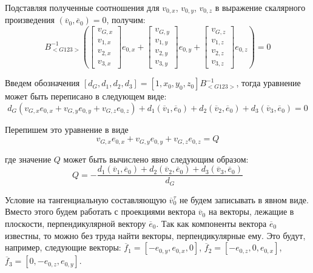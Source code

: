 Подставляя полученные соотношения для $v_{0,x}$, $v_{0,y}$, $v_{0,z}$ в выражение скалярного произведения $(\overline{v}_0, \overline{e}_0) = 0$, получим:
\begin{equation}
	[1, x_0, y_0, z_0] B_{<G123>}^{-1}
	\left(
		\begin{bmatrix}
			v_{G,x} \\
			v_{1,x} \\
			v_{2,x} \\
			v_{3,x}
		\end{bmatrix} e_{0,x} +
		\begin{bmatrix}
			v_{G,y} \\
			v_{1,y} \\
			v_{2,y} \\
			v_{3,y}
		\end{bmatrix} e_{0,y} +
		\begin{bmatrix}
			v_{G,z} \\
			v_{1,z} \\
			v_{2,z} \\
			v_{3,z}
		\end{bmatrix} e_{0,z}
	\right) = 0
\end{equation}

Введем обозначения $[d_G, d_1, d_2, d_3] = [1, x_0, y_0, z_0] B_{<G123>}^{-1}$, тогда уравнение может быть переписано в следующем виде:
\begin{equation}
	d_G(v_{G,x}e_{0,x} + v_{G,y}e_{0,y} + v_{G,z}e_{0,z}) + d_1(\overline{v}_1, \overline{e}_0) + d_2(\overline{v}_2, \overline{e}_0) + d_3(\overline{v}_3, \overline{e}_0) = 0
\end{equation}

Перепишем это уравнение в виде
\begin{equation}
	v_{G,x}e_{0,x} + v_{G,y}e_{0,y} + v_{G,z}e_{0,z} = Q
\end{equation}

где значение $Q$ может быть вычислено явно следующим образом:
\begin{equation}
	Q = -\frac{d_1(\overline{v}_1, \overline{e}_0) + d_2(\overline{v}_2, \overline{e}_0) + d_3(\overline{v}_3, \overline{e}_0)}{d_G}
\end{equation}

Условие на тангенциальную составляющую $\overline{v}_0^{\tau}$ не будем записывать в явном виде.
Вместо этого будем работать с проекциями вектора $\overline{v}_0$ на векторы, лежащие в плоскости, перпендикулярной вектору $\overline{e}_0$.
Так как компоненты вектора $\overline{e}_0$ известны, то можно без труда найти векторы, перпендикулярные ему.
Это будут, например, следующие векторы: $\overline{f}_1 = [-e_{0,y}, e_{0,x}, 0]$, $\overline{f}_2 = [-e_{0,z}, 0, e_{0,x}]$, $\overline{f}_3 = [0, -e_{0,z}, e_{0,y}]$.

